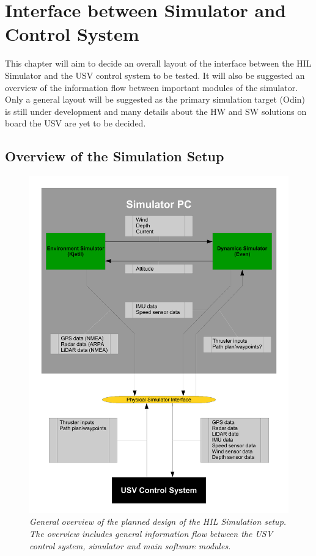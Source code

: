 \chapter{Interface between Simulator and Control System}
This chapter will aim to decide an overall layout of the interface between the HIL Simulator and the USV control system to be tested. It will also be suggested an overview of the information flow between important modules of the simulator. Only a general layout will be suggested as the primary simulation target (Odin) is still under development and many details about the HW and SW solutions on board the USV are yet to be decided.

\newpage
\section{Overview of the Simulation Setup}
\begin{figure}
	\vspace{-40pt}
	\begin{center}
		\includegraphics[width= \linewidth]{fig/Interface.pdf}
		\vspace{-40pt}
		\caption{\it{General overview of the planned design of the HIL Simulation setup. The overview includes general information flow between the USV control system, simulator and main software modules.}}
		\label{fig:simLayout}
	\end{center}	
\end{figure}

